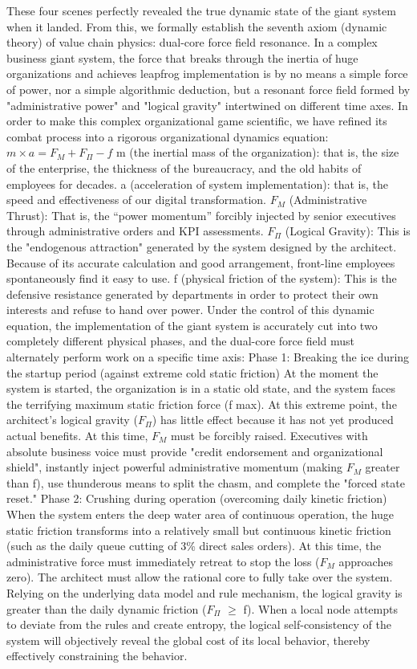 \documentclass[11pt,a4paper]{article}
\begin{document}
These four scenes perfectly revealed the true dynamic state of the giant system when it landed. From this, we formally establish the seventh axiom (dynamic theory) of value chain physics: dual-core force field resonance. In a complex business giant system, the force that breaks through the inertia of huge organizations and achieves leapfrog implementation is by no means a simple force of power, nor a simple algorithmic deduction, but a resonant force field formed by "administrative power" and "logical gravity" intertwined on different time axes. In order to make this complex organizational game scientific, we have refined its combat process into a rigorous organizational dynamics equation: $m \times a = F_M + F_\Pi - f$ m (the inertial mass of the organization): that is, the size of the enterprise, the thickness of the bureaucracy, and the old habits of employees for decades. a (acceleration of system implementation): that is, the speed and effectiveness of our digital transformation. $F_M$ (Administrative Thrust): That is, the “power momentum” forcibly injected by senior executives through administrative orders and KPI assessments. $F_\Pi$ (Logical Gravity): This is the "endogenous attraction" generated by the system designed by the architect. Because of its accurate calculation and good arrangement, front-line employees spontaneously find it easy to use. f (physical friction of the system): This is the defensive resistance generated by departments in order to protect their own interests and refuse to hand over power. Under the control of this dynamic equation, the implementation of the giant system is accurately cut into two completely different physical phases, and the dual-core force field must alternately perform work on a specific time axis: Phase 1: Breaking the ice during the startup period (against extreme cold static friction) At the moment the system is started, the organization is in a static old state, and the system faces the terrifying maximum static friction force (f max). At this extreme point, the architect's logical gravity ($F_\Pi$) has little effect because it has not yet produced actual benefits. At this time, $F_M$ must be forcibly raised. Executives with absolute business voice must provide "credit endorsement and organizational shield", instantly inject powerful administrative momentum (making $F_M$ greater than f), use thunderous means to split the chasm, and complete the "forced state reset." Phase 2: Crushing during operation (overcoming daily kinetic friction) When the system enters the deep water area of continuous operation, the huge static friction transforms into a relatively small but continuous kinetic friction (such as the daily queue cutting of 3\% direct sales orders). At this time, the administrative force must immediately retreat to stop the loss ($F_M$ approaches zero). The architect must allow the rational core to fully take over the system. Relying on the underlying data model and rule mechanism, the logical gravity is greater than the daily dynamic friction ($F_\Pi$ $\ge$ f). When a local node attempts to deviate from the rules and create entropy, the logical self-consistency of the system will objectively reveal the global cost of its local behavior, thereby effectively constraining the behavior.
\end{document}
